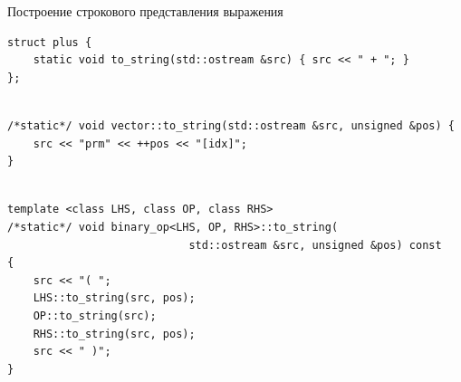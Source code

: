\documentclass[@BEAMER_OPTIONS@]{beamer}
\begin{document}
\begin{frame}[fragile]{Построение строкового представления выражения}
    \begin{exampleblock}{}
        \begin{lstlisting}
struct plus {
    static void to_string(std::ostream &src) { src << " + "; }
};
        \end{lstlisting}
        \pause
        \begin{lstlisting}[firstnumber=last]

/*static*/ void vector::to_string(std::ostream &src, unsigned &pos) {
    src << "prm" << ++pos << "[idx]";
}
        \end{lstlisting}
        \pause
        \begin{lstlisting}[firstnumber=last]

template <class LHS, class OP, class RHS>
/*static*/ void binary_op<LHS, OP, RHS>::to_string(
                            std::ostream &src, unsigned &pos) const
{
    src << "( ";
    LHS::to_string(src, pos);
    OP::to_string(src);
    RHS::to_string(src, pos);
    src << " )";
}
        \end{lstlisting}
    \end{exampleblock}
\end{frame}

\end{document}
